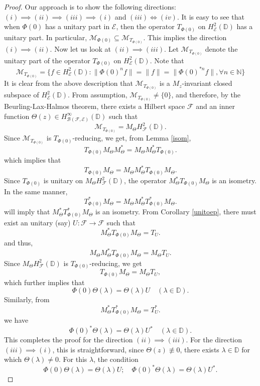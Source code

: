 \documentclass[12pt]{amsart}
\numberwithin{equation}{section}
\theoremstyle{definition}
\newcommand{\Nat}{\mathbb{N}}
\newcommand{\D}{\mathbb{D}}
\newcommand{\1}{{\mbox{\bf 1}}}
\newcommand{\clb}{\mathcal{B}}
\newcommand{\cle}{\mathcal{E}}
\newcommand{\clf}{\mathcal{F}}
\newcommand{\clm}{\mathcal{M}}
\newcommand{\raro}{\rightarrow}
\begin{document}
\begin{proof}
Our approach is to show the following directions: $(i) \implies (ii) \implies (iii) \implies (i)$ and $
(iii) \Longleftrightarrow (iv)$. It is easy to see that when $\Phi(0)$ has a unitary part in $\cle$, then the operator $T_{\Phi(0)}$ on $H_{\cle}^2(\D)$ has a unitary part. In particular, $\clm_{\Phi(0)} \subseteq \clm_{T_{\Phi(0)}}$. This implies the direction $(i) \implies (ii)$. Now let us look at $(ii) \implies (iii)$.  Let $\clm_{T_{\Phi(0)}}$ denote the unitary part of the operator $T_{\Phi(0)}$ on $H_{\cle}^2(\D)$. Note that
\[
\clm_{T_{\Phi(0)}} = \{f \in H_{\cle}^2(\D): \|\Phi(0)^n f \| = \|f\| = \|\Phi(0)^{*n} f\|, \forall n \in \Nat\}
\]
It is clear from the above description that $\clm_{T_{\Phi(0)}}$ is a $M_z$-invariant closed subspace of $H_{\cle}^2(\D)$. From assumption, $\clm_{T_{\Phi(0)}} \neq \{0\}$, and therefore, by the Beurling-Lax-Halmos theorem, there exists a Hilbert space $\clf$ and an inner function $\Theta(z) \in H_{\clb(\clf,\cle)}^{\infty}(\D)$ such that
\[
\clm_{T_{\Phi(0)}} = M_{\Theta} H_{\clf}^2(\D).
\]
Since $\clm_{T_{\Phi(0)}}$ is $T_{\Phi(0)}$-reducing, we get, from Lemma \ref{isom},
\[
T_{\Phi(0)}  M_{\Theta} M_{\Theta}^*= M_{\Theta}M_{\Theta}^* T_{\Phi(0)}.
\]
which implies that
\[
 T_{\Phi(0)}  M_{\Theta} = M_{\Theta}M_{\Theta}^* T_{\Phi(0)} M_{\Theta}.
\]
Since $T_{\Phi(0)}$ is unitary on $M_{\Theta} H_{\clf}^2(\D)$, the operator $M_{\Theta}^* T_{\Phi(0)} M_{\Theta}$ is an isometry.  In the same manner, 
\[
 T_{\Phi(0)}^* M_{\Theta}= M_{\Theta}M_{\Theta}^*  T_{\Phi(0)}^*  M_{\Theta}.
\]
will imply that $M_{\Theta}^* T_{\Phi(0)}^* M_{\Theta}$ is an isometry. From Corollary \ref{unitoep}, there must exist an unitary (say) $U:\clf \raro \clf$ such that 
\[
M_{\Theta}^* T_{\Phi(0)} M_{\Theta} = T_U.
\]
and thus, 
\[
M_{\Theta} M_{\Theta}^* T_{\Phi(0)} M_{\Theta} = M_{\Theta} T_U.
\]
Since $M_{\Theta} H_{\clf}^2(\D)$ is $T_{\Phi(0)}$-reducing, we get
\[
T_{\Phi(0)} M_{\Theta} = M_{\Theta} T_U,
\]
which further implies that 
\[
\Phi(0) \Theta(\lambda) = \Theta(\lambda) U \quad (\lambda \in \D).
\]
Similarly, from 
\[
M_{\Theta}^* T_{\Phi(0)}^* M_{\Theta} = T_U^*.
\]
we have
\[
\Phi(0)^* \Theta(\lambda) =  \Theta(\lambda) U^* \quad (\lambda \in \D).
\]
This completes the proof for the direction $(ii) \implies (iii)$. For the direction $(iii) \implies (i)$, this is straightforward, since $\Theta(z) \not\equiv 0$, there exists $\lambda \in \D$ for which $\Theta(\lambda) \neq 0$. For this $\lambda$, the condition 
\[
\Phi(0) \Theta(\lambda) = \Theta(\lambda)U; \quad \Phi(0)^* \Theta(\lambda) = \Theta(\lambda)U^*.
\]
\end{proof}
\end{document}
